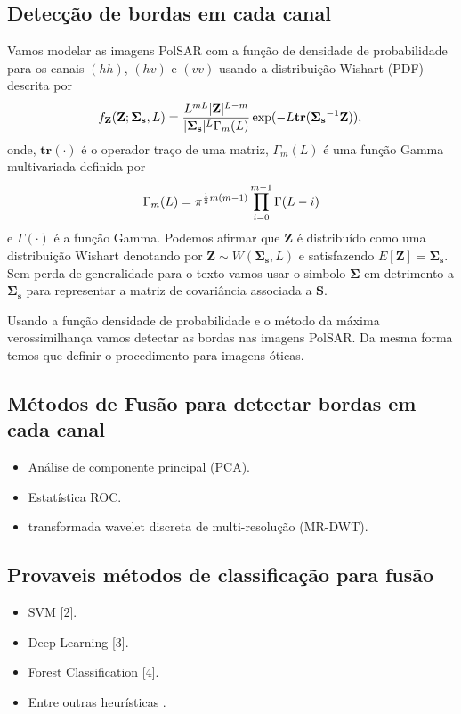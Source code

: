 \documentclass[runningheads]{llncs}
\begin{document}
\subsection{Detecção de bordas em cada canal}
 Vamos modelar as imagens PolSAR com a função de densidade de probabilidade para os canais $(hh)$, $(hv)$ e $(vv)$ usando a distribuição Wishart (PDF) descrita por
\begin{equation}
    f_{\mathbf{Z}}(\mathbf{Z};\mathbf{\Sigma_{s}},L)=\frac{L^{mL}|\mathbf{Z}|^{L-m}}{|\mathbf{\Sigma_{s}}|^{L}\Gamma_m(L)} \exp(-L\mathbf{tr}(\mathbf{\Sigma_{s}}^{-1}\mathbf{Z})), \\
\end{equation} 
onde, $\mathbf{tr}(\cdot)$ é o operador traço de uma matriz, $\Gamma_m(L)$ é uma função Gamma multivariada definida por
\begin{equation}\label{cap_acf_10}
	\Gamma_m(L)=\pi^{\frac{1}{2}m(m-1)} \prod_{i=0}^{m-1}\Gamma(L-i) \\
\end{equation}
e $\Gamma(\cdot)$ é a função Gamma. Podemos afirmar que $\mathbf{Z}$ é distribuído como uma distribuição Wishart denotando por $\mathbf{Z}\sim W(\mathbf{\Sigma_{s}}, L)$ e satisfazendo $E[\mathbf{Z}]=\mathbf{\Sigma_{s}}$. Sem perda de generalidade para o texto vamos usar o simbolo $\mathbf{\Sigma}$ em detrimento a $\mathbf{\Sigma_{s}}$ para representar a matriz de covariância associada a $\mathbf{S}$.
 
Usando a função densidade de probabilidade e o método da máxima verossimilhança vamos detectar as bordas nas imagens PolSAR. Da mesma forma temos que definir o procedimento para imagens óticas. 
\subsection{Métodos de Fusão para detectar bordas em cada canal}
\begin{itemize}
  \item Análise de componente principal (PCA).
  \item Estatística ROC.
  \item transformada wavelet discreta de multi-resolução (MR-DWT).
\end{itemize}

\subsection{Provaveis métodos de classificação para fusão}
\begin{itemize}
  \item SVM [2].
  \item Deep Learning [3].
  \item Forest Classification [4].
  \item Entre outras heurísticas .
\end{itemize}
\end{document}
